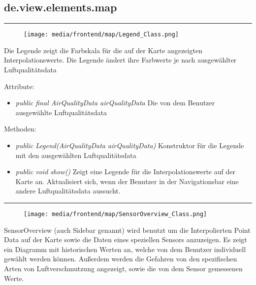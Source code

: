 \subsection{de.view.elements.map}

\rule{\textwidth}{0.4pt} 
\begin{minipage}{0.3\textwidth}
    \begin{figure}[H]
        \texttt{[image: media/frontend/map/Legend\_Class.png]}
    \end{figure}
    \end{minipage} \hfill
    \begin{minipage}{0.6\textwidth}
Die Legende zeigt die Farbskala für die auf der Karte angezeigten Interpolationswerte. Die Legende ändert ihre Farbwerte je nach ausgewählter Luftqualitätsdata
\end{minipage}

Attribute:
\begin{itemize} 
    \item \emph{public final AirQualityData airQualityData} Die von dem Benutzer ausgewählte Luftqualitätsdata
\end{itemize} 
Methoden:
\begin{itemize}     
    \item \emph{public Legend(AirQualityData airQualityData)} Konstruktor für die Legende mit den ausgewählten Luftqualitätsdata
    \item \emph{public void show()} Zeigt eine Legende für die Interpolationswerte auf der Karte an. Aktualisiert sich, wenn der Benutzer in der Navigationsbar eine andere Luftqualitätsdata aussucht.
\end{itemize}

\rule{\textwidth}{0.4pt} 
\begin{minipage}{0.3\textwidth}
    \begin{figure}[H]
        \texttt{[image: media/frontend/map/SensorOverview\_Class.png]}
    \end{figure}
    \end{minipage} \hfill
    \begin{minipage}{0.6\textwidth}
SensorOverview (auch Sidebar genannt) wird benutzt um die Interpolierten Point Data auf der Karte sowie die Daten eines speziellen Sensors anzuzeigen. Es zeigt ein Diagramm mit historischen Werten an, welche von dem Benutzer individuell gewählt werden können. Außerdem werden die Gefahren von den spezifischen Arten von Luftverschmutzung angezeigt, sowie die von dem Sensor gemessenen Werte.
\end{minipage}

